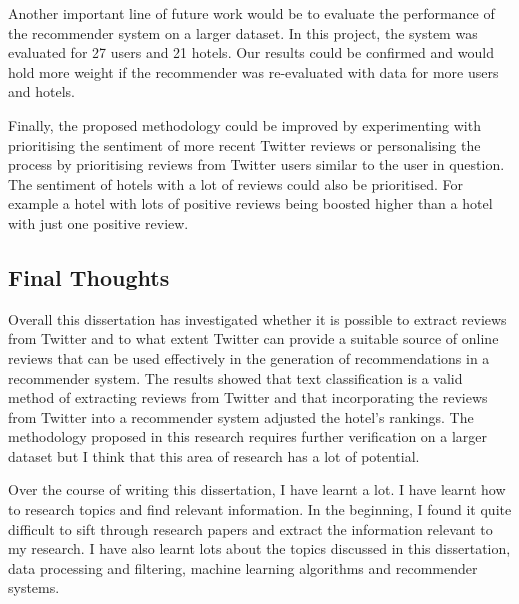 Another important line of future work would be to evaluate the performance of the recommender system on a larger dataset. In this project, the system was evaluated for 27 users and 21 hotels. Our results could be confirmed and would hold more weight if the recommender was re-evaluated with data for more users and hotels.

Finally, the proposed methodology could be improved by experimenting with prioritising the sentiment of more recent Twitter reviews or personalising the process by prioritising reviews from Twitter users similar to the user in question. The sentiment of hotels with a lot of reviews could also be prioritised. For example a hotel with lots of positive reviews being boosted higher than a hotel with just one positive review.

\subsection{Final Thoughts}

Overall this dissertation has investigated whether it is possible to extract reviews from Twitter and to what extent Twitter can provide a suitable source of online reviews that can be used effectively in the generation of recommendations in a recommender system. The results showed that text classification is a valid method of extracting reviews from Twitter and that incorporating the reviews from Twitter into a recommender system adjusted the hotel's rankings. The methodology proposed in this research requires further verification on a larger dataset but I think that this area of research has a lot of potential. 

Over the course of writing this dissertation, I have learnt a lot. I have learnt how to research topics and find relevant information. In the beginning, I found it quite difficult to sift through research papers and extract the information relevant to my research. I have also learnt lots about the topics discussed in this dissertation, data processing and filtering, machine learning algorithms and recommender systems.